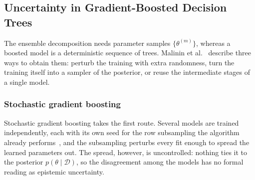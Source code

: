 \subsection{Uncertainty in Gradient-Boosted Decision Trees}
    \label{subsec:bg:uncertainty:gbm}
    The ensemble decomposition needs parameter samples $\{\theta^{(m)}\}$,
    whereas a boosted model is a deterministic sequence of trees. Malinin et
    al.~\cite{malinin2021} describe three ways to obtain them: perturb the
    training with extra randomness, turn the training itself into a sampler of
    the posterior, or reuse the intermediate stages of a single model.

    \subsubsection{Stochastic gradient boosting} 
        Stochastic gradient boosting takes the first route. Several models are
        trained independently, each with its own seed for the row subsampling the
        algorithm already performs~\cite{friedman2002}, and the subsampling perturbs
        every fit enough to spread the learned parameters out. The spread,
        however, is uncontrolled: nothing ties it to the posterior $p(\theta \mid \mathcal{D})$, so
        the disagreement among the models has no formal reading as epistemic
        uncertainty.
    
